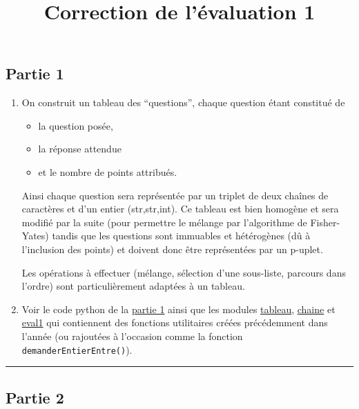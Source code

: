 \documentclass[french]{scrartcl}
\title{Correction de l'évaluation 1}
\author{}
\date{}
\providecommand{\tightlist}{%
  \setlength{\itemsep}{0pt}\setlength{\parskip}{0pt}}
\begin{document}
\maketitle
\thispagestyle{fancy}

\hypertarget{partie-1}{%
\subsection{Partie 1}\label{partie-1}}

\begin{enumerate}
\def\labelenumi{\arabic{enumi}.}
\item
  On construit un tableau des ``questions'', chaque question étant
  constitué de

  \begin{itemize}
  \tightlist
  \item
    la question posée,
  \item
    la réponse attendue
  \item
    et le nombre de points attribués.
  \end{itemize}

  Ainsi chaque question sera représentée par un triplet de deux chaînes
  de caractères et d'un entier (str,str,int). Ce tableau est bien
  homogène et sera modifié par la suite (pour permettre le mélange par
  l'algorithme de Fisher-Yates) tandis que les questions sont immuables
  et hétérogènes (dû à l'inclusion des points) et doivent donc être
  représentées par un p-uplet.

  Les opérations à effectuer (mélange, sélection d'une sous-liste,
  parcours dans l'ordre) sont particulièrement adaptées à un tableau.
\item
  Voir le code python de la \href{partie1.py}{partie 1} ainsi que les
  modules \href{tableau.py}{tableau}, \href{chaine.py}{chaine} et
  \href{eval1.py}{eval1} qui contiennent des fonctions utilitaires
  créées précédemment dans l'année (ou rajoutées à l'occasion comme la
  fonction \texttt{demanderEntierEntre()}).
\end{enumerate}

\begin{center}\rule{0.5\linewidth}{0.5pt}\end{center}

\hypertarget{partie-2}{%
\subsection{Partie 2}\label{partie-2}}
\end{document}
